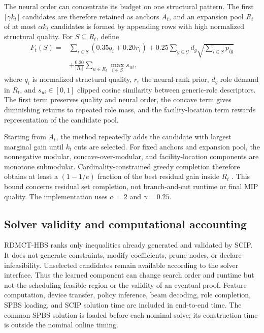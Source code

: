 \documentclass[preprint,12pt,authoryear]{elsarticle}
\newcommand{\method}{RDMCT-HBS}
\begin{document}
The neural order can concentrate its budget on one structural pattern. The
first $\lceil\gamma k_t\rceil$ candidates are therefore retained as anchors
$A_t$, and an expansion pool $R_t$ of at most $\alpha k_t$ candidates is
formed by appending rows with high normalized structural quality. For
$S\subseteq R_t$, define
\begin{align}
F_t(S)={}&\sum_{i\in S}(0.35q_i+0.20r_i)
+0.25\sum_{g\in\mathcal G}d_g
\sqrt{\sum_{i\in S}p_{ig}}\nonumber\\
&+\frac{0.20}{|R_t|}
\sum_{u\in R_t}\max_{i\in S}s_{ui},
\label{eq:submodular}
\end{align}
where $q_i$ is normalized structural quality, $r_i$ the neural-rank prior,
$d_g$ role demand in $R_t$, and $s_{ui}\in[0,1]$ clipped cosine similarity
between generic-role descriptors. The first term preserves quality and neural
order, the concave term gives diminishing returns to repeated role mass, and
the facility-location term rewards representation of the candidate pool.

Starting from $A_t$, the method repeatedly adds the candidate with largest
marginal gain until $k_t$ cuts are selected. For fixed anchors and expansion
pool, the nonnegative modular, concave-over-modular, and facility-location
components are monotone submodular. Cardinality-constrained greedy completion
therefore obtains at least a $(1-1/e)$ fraction of the best residual gain
inside $R_t$ \citep{nemhauser1978analysis}. This bound concerns residual set
completion, not branch-and-cut runtime or final MIP quality. The implementation
uses $\alpha=2$ and $\gamma=0.25$.

\subsection{Solver validity and computational accounting}

\method{} ranks only inequalities already generated and validated by SCIP. It
does not generate constraints, modify coefficients, prune nodes, or declare
infeasibility. Unselected candidates remain available according to the solver
interface. Thus the learned component can change search order and runtime but
not the scheduling feasible region or the validity of an eventual proof.
Feature computation, device transfer, policy inference, beam decoding, role
completion, SPBS loading, and SCIP solution time are included in end-to-end
time. The common SPBS solution is loaded before each nominal solve; its
construction time is outside the nominal online timing.
\end{document}
